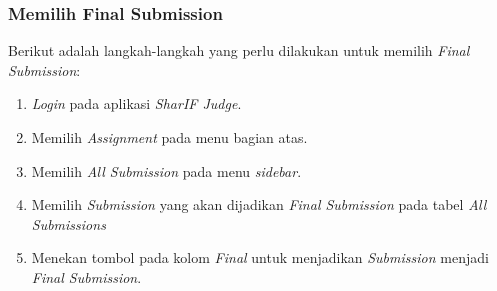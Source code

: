 \subsubsection{Memilih Final Submission}
\label{subsubsec:skenario_final_submission}
Berikut adalah langkah-langkah yang perlu dilakukan untuk memilih \textit{Final Submission}:

\begin{enumerate}
	\item \textit{Login} pada aplikasi \textit{SharIF Judge}.
	\item Memilih \textit{Assignment} pada menu bagian atas.
	\item Memilih \textit{All Submission} pada menu \textit{sidebar}.
	\item Memilih \textit{Submission} yang akan dijadikan \textit{Final Submission} pada tabel \textit{All Submissions}
	\item Menekan tombol pada kolom \textit{Final} untuk menjadikan \textit{Submission} menjadi \textit{Final Submission}.
\end{enumerate}